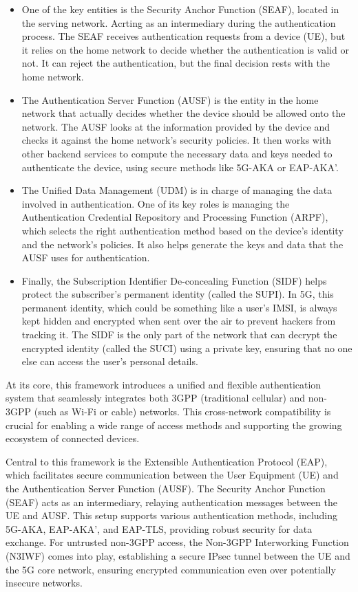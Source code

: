 \begin{itemize}
    \item{
        One of the key entities is the Security Anchor Function (SEAF), located in the serving network. Acrting as an intermediary during the authentication process. The SEAF receives authentication requests from a device (UE), but it relies on the home network to decide whether the authentication is valid or not. It can reject the authentication, but the final decision rests with the home network.
    }
    \item{
        The Authentication Server Function (AUSF) is the entity in the home network that actually decides whether the device should be allowed onto the network. The AUSF looks at the information provided by the device and checks it against the home network's security policies. It then works with other backend services to compute the necessary data and keys needed to authenticate the device, using secure methods like 5G-AKA or EAP-AKA’.
    }
    \item{
        The Unified Data Management (UDM) is in charge of managing the data involved in authentication. One of its key roles is managing the Authentication Credential Repository and Processing Function (ARPF), which selects the right authentication method based on the device's identity and the network's policies. It also helps generate the keys and data that the AUSF uses for authentication.
    }
    \item{
        Finally, the Subscription Identifier De-concealing Function (SIDF) helps protect the subscriber's permanent identity (called the SUPI). In 5G, this permanent identity, which could be something like a user’s IMSI, is always kept hidden and encrypted when sent over the air to prevent hackers from tracking it. The SIDF is the only part of the network that can decrypt the encrypted identity (called the SUCI) using a private key, ensuring that no one else can access the user’s personal details.
    }
\end{itemize}

At its core, this framework introduces a unified and flexible authentication system that seamlessly integrates both 3GPP (traditional cellular) and non-3GPP (such as Wi-Fi or cable) networks. This cross-network compatibility is crucial for enabling a wide range of access methods and supporting the growing ecosystem of connected devices.

Central to this framework is the Extensible Authentication Protocol (EAP), which facilitates secure communication between the User Equipment (UE) and the Authentication Server Function (AUSF). The Security Anchor Function (SEAF) acts as an intermediary, relaying authentication messages between the UE and AUSF. This setup supports various authentication methods, including 5G-AKA, EAP-AKA', and EAP-TLS, providing robust security for data exchange. For untrusted non-3GPP access, the Non-3GPP Interworking Function (N3IWF) comes into play, establishing a secure IPsec tunnel between the UE and the 5G core network, ensuring encrypted communication even over potentially insecure networks.%

